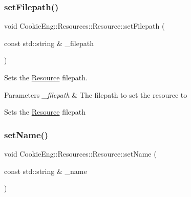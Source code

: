 \mbox{\label{class_cookie_eng_1_1_resources_1_1_resource_a9ad88ddeec633dbb1df1b6f1f8ff4c47}} 
\subsubsection{\texorpdfstring{set\+Filepath()}{setFilepath()}}
{\footnotesize\ttfamily void Cookie\+Eng\+::\+Resources\+::\+Resource\+::set\+Filepath (\begin{DoxyParamCaption}\item[{const std\+::string \&}]{\+\_\+filepath }\end{DoxyParamCaption})\hspace{0.3cm}{\ttfamily [inline]}}



Sets the \hyperlink{class_cookie_eng_1_1_resources_1_1_resource}{Resource} filepath. 


\begin{DoxyParams}{Parameters}
{\em \+\_\+filepath} & The filepath to set the resource to\\
\hline
\end{DoxyParams}
Sets the \hyperlink{class_cookie_eng_1_1_resources_1_1_resource}{Resource} filepath \mbox{\label{class_cookie_eng_1_1_resources_1_1_resource_a3968130b5e2207df4735a616c6545158}} 
\subsubsection{\texorpdfstring{set\+Name()}{setName()}}
{\footnotesize\ttfamily void Cookie\+Eng\+::\+Resources\+::\+Resource\+::set\+Name (\begin{DoxyParamCaption}\item[{const std\+::string \&}]{\+\_\+name }\end{DoxyParamCaption})\hspace{0.3cm}{\ttfamily [inline]}}



